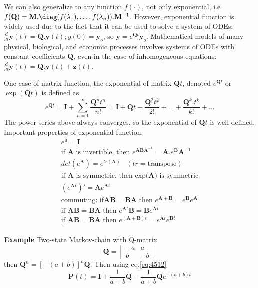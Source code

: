 \begin{framed}
We can also generalize to any function $f(\cdot)$, not only exponential, i.e
$f(\mathbf{Q})=\mathbf{M}. \diag(f(\lambda_1),\ldots,f(\lambda_n)).\mathbf{M}^{-1}$.
However, exponential function is widely used due to the fact that it can be used
to solve a system of ODEs: $\frac{d}{dt}\mathbf{y}(t) = \mathbf{Q.y}(t);
y(0)=\mathbf{y}_o$, so $\mathbf{y}= e^{\mathbf{Q}t}\mathbf{y}_o$. Mathematical
models of many physical, biological, and economic processes involves systems of
ODEs with constant coefficients $\mathbf{Q}$, even in the case of inhomogeneous
equations: $\frac{d}{dt}\mathbf{y}(t) = \mathbf{Q.y}(t)+ \mathbf{z}(t)$.

One case of matrix function, the exponential of matrix $\mathbf{Q}t$, denoted
$e^{\mathbf{Q}t}$ or $\exp(\mathbf{Q}t)$ is defined as
\begin{equation}
e^{\mathbf{Q}t} = \mathbf{I}+\sum_{n=1}^\infty\frac{\mathbf{Q}^nt^n}{n!}=
\mathbf{I} + \mathbf{Q}t +
\frac{\mathbf{Q}^2t^2}{2!}+\ldots+\frac{\mathbf{Q}^k.t^k}{k!} + \ldots
\end{equation}
The power series above always converges, so the exponential of $\mathbf{Q}t$ is
well-defined. Important properties of exponential function:
\begin{eqnarray}
e^{\mathbf{0}} = \mathbf{I} \\
\text{if } \mathbf{A} \text{ is invertible, then } e^{\mathbf{ABA}^{-1}} =
\mathbf{A}.e^{\mathbf{B}}\mathbf{A}^{-1} \\
det(e^\mathbf{A}) = e^{tr(\mathbf{A})} \;\;\; (tr=\text{transpose}) \\
\text{if $\mathbf{A}$ is symmetric, then exp($\mathbf{A}$) is symmetric} \\
(e^{\mathbf{A}t})' = \mathbf{A}e^{\mathbf{A}t} \\
\text{commuting: if} \mathbf{AB=BA}\text{ then } e^{\mathbf{A+B}}=
e^\mathbf{B}e^\mathbf{A} \\
 \text{if }\mathbf{AB=BA}\text{ then } e^{\mathbf{A}t}\mathbf{B}=
\mathbf{B}e^{\mathbf{A}t} \\
\text{if }\mathbf{AB=BA}\text{ then } e^{(\mathbf{A+B})t}=
e^{\mathbf{A}t} e^{\mathbf{B}t} \\
\ldots
\end{eqnarray}

\end{framed}

{\bf Example} Two-state Markov-chain with Q-matrix
\begin{equation}
\mathbf{Q} = \left[ \begin{array}{cc}
-a & a \\
b & -b
\end{array} \right]
\end{equation}
then $\mathbf{Q}^n=\left[-(a+b)\right]^n \mathbf{Q}$. Then using
eq.\ref{eq:4512}
\begin{equation}
\mathbf{P}(t) = \mathbf{I} + \frac{1}{a+b}\mathbf{Q} -
\frac{1}{a+b}\mathbf{Q}e^{-(a+b)t}
\end{equation}


